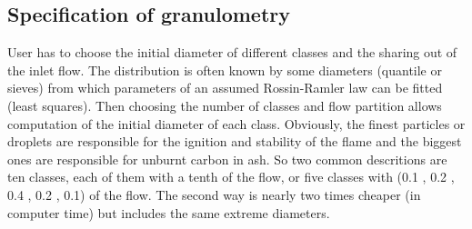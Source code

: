\subsection{Specification of granulometry}

User has to choose the initial diameter of different classes and the sharing out
of the inlet flow. The distribution is often known by some diameters (quantile
or sieves) from which parameters of an assumed Rossin-Ramler law can be fitted
(least squares). Then choosing the number of classes and flow partition allows
computation of the initial diameter of each class. Obviously, the finest
particles or droplets are responsible for the ignition and stability of the
flame and the biggest ones are responsible for unburnt carbon in ash. So two
common descritions are ten classes, each of them with a tenth of the flow, or
five classes with (0.1 , 0.2 , 0.4 , 0.2 , 0.1) of the flow. The second way is
nearly two times cheaper (in computer time) but includes the same extreme
diameters.

